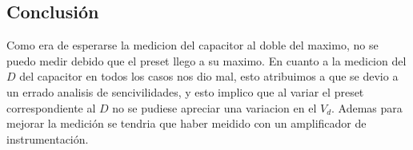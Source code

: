 \documentclass[../../main.tex]{subfiles}
\begin{document}
\subsection{Conclusión}
Como era de esperarse la medicion del capacitor al doble del maximo, no se puedo medir debido que el preset llego a su maximo. En cuanto a la medicion del $D$ del capacitor en todos los casos nos dio mal, esto atribuimos a que se devio a un errado analisis de sencivilidades, y esto implico que al variar el preset correspondiente al $D$ no se pudiese apreciar una variacion en el $V_d$. Ademas para mejorar la medición se tendria que haber meidido con un amplificador de instrumentación.
\end{document}
